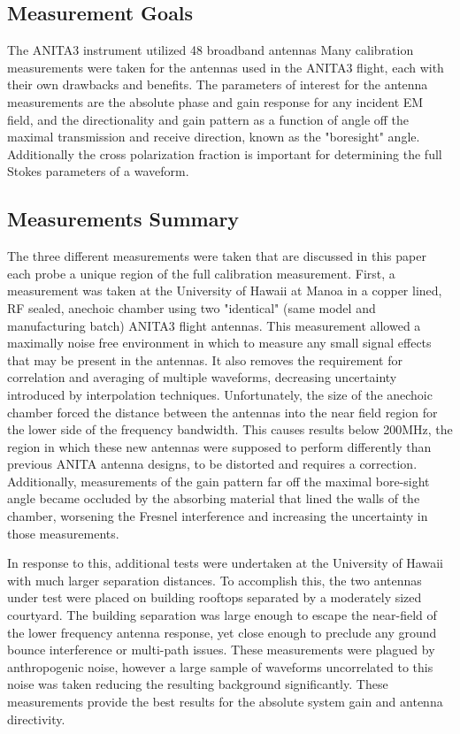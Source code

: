 	\subsection{Measurement Goals}

	The ANITA3 instrument utilized 48 broadband antennas 	Many calibration measurements were taken for the antennas used in the ANITA3 flight, each with their own drawbacks and benefits.  The parameters of interest for the antenna measurements are the absolute phase and gain response for any incident EM field, and the directionality and gain pattern as a function of angle off the maximal transmission and receive direction, known as the "boresight" angle.  Additionally the cross polarization fraction is important for determining the full Stokes parameters of a waveform.
	
	\subsection{Measurements Summary}
	
	The three different measurements were taken that are discussed in this paper each probe a unique region of the full calibration measurement.  First, a measurement was taken at the University of Hawaii at Manoa in a copper lined, RF sealed, anechoic chamber using two "identical" (same model and manufacturing batch) ANITA3 flight antennas.  This measurement allowed a maximally noise free environment in which to measure any small signal effects that may be present in the antennas.  It also removes the requirement for correlation and averaging of multiple waveforms, decreasing uncertainty introduced by interpolation techniques.  Unfortunately, the size of the anechoic chamber forced the distance between the antennas into the near field region for the lower side of the frequency bandwidth.  This causes results below 200MHz, the region in which these new antennas were supposed to perform differently than previous ANITA antenna designs, to be distorted and requires a correction.  Additionally, measurements of the gain pattern far off the maximal bore-sight angle became occluded by the absorbing material that lined the walls of the chamber, worsening the Fresnel interference and increasing the uncertainty in those measurements.
	
	In response to this, additional tests were undertaken at the University of Hawaii with much larger separation distances.  To accomplish this, the two antennas under test were placed on building rooftops separated by a moderately sized courtyard.  The building separation was large enough to escape the near-field of the lower frequency antenna response, yet close enough to preclude any ground bounce interference or multi-path issues.  These measurements were plagued by anthropogenic noise, however a large sample of waveforms uncorrelated to this noise was taken reducing the resulting background significantly.  These measurements provide the best results for the absolute system gain and antenna directivity.
	
